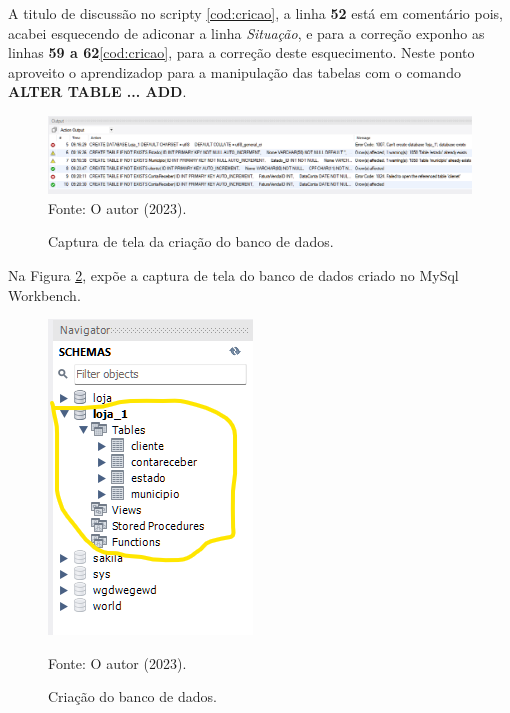 

\par A titulo de discussão no scripty \ref{cod:cricao}, a linha \textbf{52} está em comentário pois, acabei esquecendo de adiconar a linha \textit{Situação}, e para a correção exponho as linhas \textbf{59 a 62}\ref{cod:cricao}, para a correção deste esquecimento. Neste ponto aproveito o aprendizadop para a manipulação das tabelas com o comando \textbf{ALTER TABLE ... ADD}.

 \begin{figure}[h!]
 \caption{Captura de tela da criação do banco de dados.}
 \includegraphics[width=\textwidth]{figure/fragmento.png}
 \label{fig:fragmento}
 {\fontsize{10pt}{\baselineskip}\selectfont
 Fonte: O autor (2023).}
 \end{figure}
\par Na Figura \ref{fig:banco}, expõe a captura de tela do banco de dados criado no MySql Workbench.
\newpage
 \begin{figure}[h!]
 \caption{Criação do banco de dados.}
 \begin{center}
    \includegraphics[scale=1]{figure/banco.png}
 \end{center}
 \label{fig:banco}
 {\fontsize{10pt}{\baselineskip}\selectfont
 Fonte: O autor (2023).}
 \end{figure}



